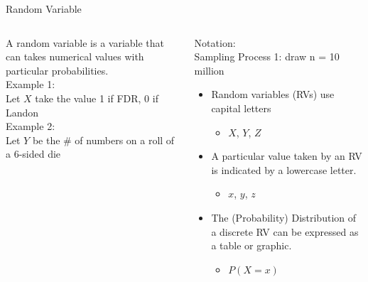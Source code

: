 \documentclass[aspectratio=169]{../latex_main/tntbeamer}  %
\begin{document}
	
	\begin{frame}{Random Variable}
	    \begin{columns}
	        \begin{column}{.4\textwidth}
	            A random variable is a variable that can takes numerical values with particular probabilities.\\
	            \bigskip
	            Example 1:\\
                Let $X$ take the value 1 if FDR, 0 if Landon\\
                \bigskip
                Example 2:\\
                Let $Y$ be the \# of numbers on a roll of a 6-sided die
	        \end{column}
	        
	        \begin{column}{.5\textwidth}
	           Notation:\\
	           Sampling Process 1: draw n = 10 million
                \begin{itemize}
                    \item Random variables (RVs) use capital letters
                    \begin{itemize}
                        \item $X$, $Y$, $Z$
                    \end{itemize}
                    \item A particular value taken by an RV is indicated by a lowercase letter.
                    \begin{itemize}
                        \item $x$, $y$, $z$
                    \end{itemize}
                    \item The (Probability) Distribution of a discrete RV can be expressed as a table or graphic.
                    \begin{itemize}
                        \item $P(X = x)$
                    \end{itemize}
                \end{itemize}
	        \end{column}
	    \end{columns}
	\end{frame}
	
\end{document}
